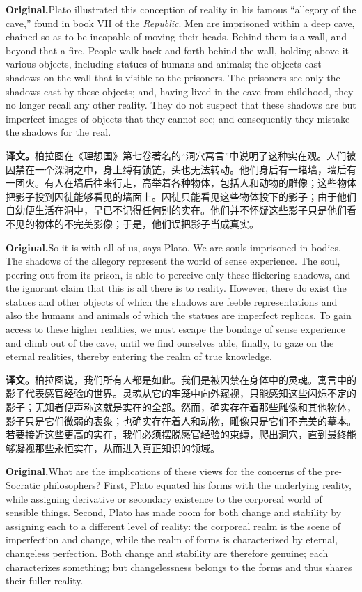 \documentclass[UTF8]{ctexart}
\newcommand{\orig}{\par\noindent\textbf{Original.}\quad}
\newcommand{\zh}{\par\noindent\textbf{译文。}\quad}
\begin{document}
\orig Plato illustrated this conception of reality in his famous ``allegory of the cave,'' found in book VII of the \textit{Republic}. Men are imprisoned within a deep cave, chained so as to be incapable of moving their heads. Behind them is a wall, and beyond that a fire. People walk back and forth behind the wall, holding above it various objects, including statues of humans and animals; the objects cast shadows on the wall that is visible to the prisoners. The prisoners see only the shadows cast by these objects; and, having lived in the cave from childhood, they no longer recall any other reality. They do not suspect that these shadows are but imperfect images of objects that they cannot see; and consequently they mistake the shadows for the real.

\zh 柏拉图在《理想国》第七卷著名的“洞穴寓言”中说明了这种实在观。人们被囚禁在一个深洞之中，身上缚有锁链，头也无法转动。他们身后有一堵墙，墙后有一团火。有人在墙后往来行走，高举着各种物体，包括人和动物的雕像；这些物体把影子投到囚徒能够看见的墙面上。囚徒只能看见这些物体投下的影子；由于他们自幼便生活在洞中，早已不记得任何别的实在。他们并不怀疑这些影子只是他们看不见的物体的不完美影像；于是，他们误把影子当成真实。

\orig So it is with all of us, says Plato. We are souls imprisoned in bodies. The shadows of the allegory represent the world of sense experience. The soul, peering out from its prison, is able to perceive only these flickering shadows, and the ignorant claim that this is all there is to reality. However, there do exist the statues and other objects of which the shadows are feeble representations and also the humans and animals of which the statues are imperfect replicas. To gain access to these higher realities, we must escape the bondage of sense experience and climb out of the cave, until we find ourselves able, finally, to gaze on the eternal realities, thereby entering the realm of true knowledge.

\zh 柏拉图说，我们所有人都是如此。我们是被囚禁在身体中的灵魂。寓言中的影子代表感官经验的世界。灵魂从它的牢笼中向外窥视，只能感知这些闪烁不定的影子；无知者便声称这就是实在的全部。然而，确实存在着那些雕像和其他物体，影子只是它们微弱的表象；也确实存在着人和动物，雕像只是它们不完美的摹本。若要接近这些更高的实在，我们必须摆脱感官经验的束缚，爬出洞穴，直到最终能够凝视那些永恒实在，从而进入真正知识的领域。

\orig What are the implications of these views for the concerns of the pre-Socratic philosophers? First, Plato equated his forms with the underlying reality, while assigning derivative or secondary existence to the corporeal world of sensible things. Second, Plato has made room for both change and stability by assigning each to a different level of reality: the corporeal realm is the scene of imperfection and change, while the realm of forms is characterized by eternal, changeless perfection. Both change and stability are therefore genuine; each characterizes something; but changelessness belongs to the forms and thus shares their fuller reality.
\end{document}

